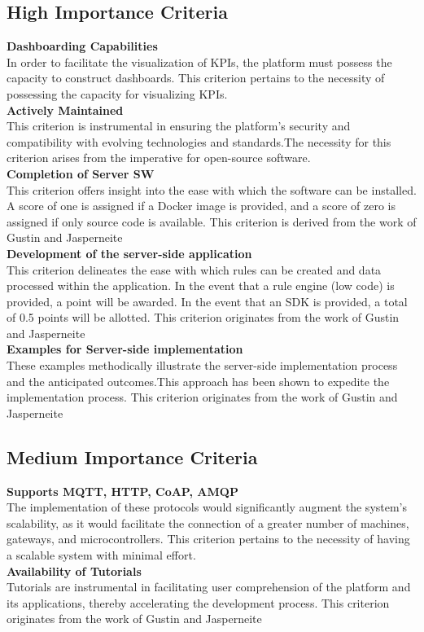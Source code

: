 \subsection{High Importance Criteria}
\textbf{Dashboarding Capabilities}\\
In order to facilitate the visualization of KPIs, the platform must possess the capacity to construct dashboards. This criterion pertains to the necessity of possessing the capacity for visualizing KPIs.\\
\textbf{Actively Maintained}\\
This criterion is instrumental in ensuring the platform's security and compatibility with evolving technologies and standards.The necessity for this criterion arises from the imperative for open-source software.\\
\textbf{Completion of Server SW}\\
This criterion offers insight into the ease with which the software can be installed. A score of one is assigned if a Docker image is provided, and a score of zero is assigned if only source code is available. This criterion is derived from the work of Gustin and Jasperneite\\
\textbf{Development of the server-side application}\\
This criterion delineates the ease with which rules can be created and data processed within the application. In the event that a rule engine (low code) is provided, a point will be awarded. In the event that an SDK is provided, a total of 0.5 points will be allotted. This criterion originates from the work of Gustin and Jasperneite\\
\textbf{Examples for Server-side implementation}\\
These examples methodically illustrate the server-side implementation process and the anticipated outcomes.This approach has been shown to expedite the implementation process.
This criterion originates from the work of Gustin and Jasperneite

\subsection{Medium Importance Criteria}
\textbf{Supports MQTT, HTTP, CoAP, AMQP}\\
The implementation of these protocols would significantly augment the system's scalability, as it would facilitate the connection of a greater number of machines, gateways, and microcontrollers. This criterion pertains to the necessity of having a scalable system with minimal effort.\\
\textbf{Availability of Tutorials}\\
Tutorials are instrumental in facilitating user comprehension of the platform and its applications, thereby accelerating the development process. This criterion originates from the work of Gustin and Jasperneite

